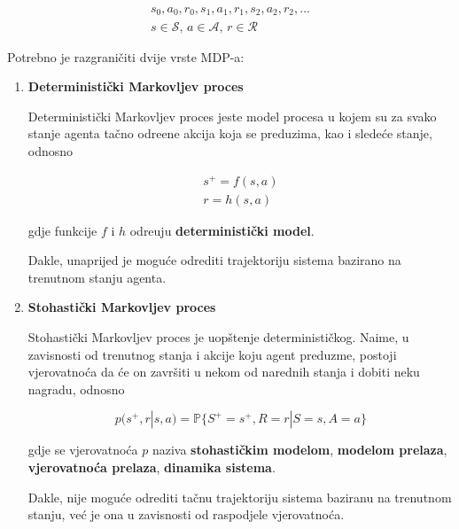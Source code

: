 \documentclass[12pt]{IEEEtran}
\numberwithin{equation}{subsection}
\numberwithin{figure}{subsection}
\theoremstyle{definition}
\numberwithin{example}{section}
\begin{document}
\begin{gather}
    s_{0}, a_{0}, r_{0}, s_{1}, a_{1}, r_{1}, s_{2}, a_{2}, r_{2}, ...\\
    s \in \mathcal{S} \text{, } a \in \mathcal{A} \text {, } r \in \mathcal{R}
\end{gather}

Potrebno je razgrani\v{c}iti dvije vrste MDP-a:

\begin{enumerate}
    \item \textbf{Deterministi\v{c}ki Markovljev proces}

          Deterministi\v{c}ki Markovljev proces jeste model procesa u kojem su
          za svako stanje agenta ta\v{c}no odre\dj{}ene akcija koja se preduzima, kao i
          slede\'{c}e stanje, odnosno

          \begin{gather}
              s^{+} = f(s, a)\\
              r = h(s, a)
          \end{gather}

          gdje funkcije $f$ i $h$ odre\dj{}uju \textbf{deterministi\v{c}ki model}. 

          Dakle, unaprijed je mogu\'{c}e odrediti trajektoriju sistema bazirano na
          trenutnom stanju agenta.

    \item \textbf{Stohasti\v{c}ki Markovljev proces}

        Stohasti\v{c}ki Markovljev proces je uop\v{s}tenje deterministi\v{c}kog.
        Naime, u zavisnosti od trenutnog stanja i akcije koju agent preduzme,
        postoji vjerovatno\'{c}a da \'{c}e on zavr\v{s}iti u nekom od narednih
        stanja i dobiti neku nagradu, odnosno

        \begin{equation}
            p(s^{+}, r | s, a) = \mathbb{P}\{S^{+} = s^{+}, R = r | S = s, A = a\}
        \end{equation}

        gdje se vjerovatno\'{c}a $p$ naziva \textbf{stohasti\v{c}kim modelom}, 
        \textbf{modelom prelaza}, \textbf{vjerovatno\'{c}a prelaza},
        \textbf{dinamika sistema}.

        Dakle, nije mogu\'{c}e odrediti ta\v{c}nu trajektoriju sistema baziranu
        na trenutnom stanju, ve\'{c} je ona u zavisnosti od raspodjele vjerovatno\'{c}a.

\end{enumerate}
\end{document}

